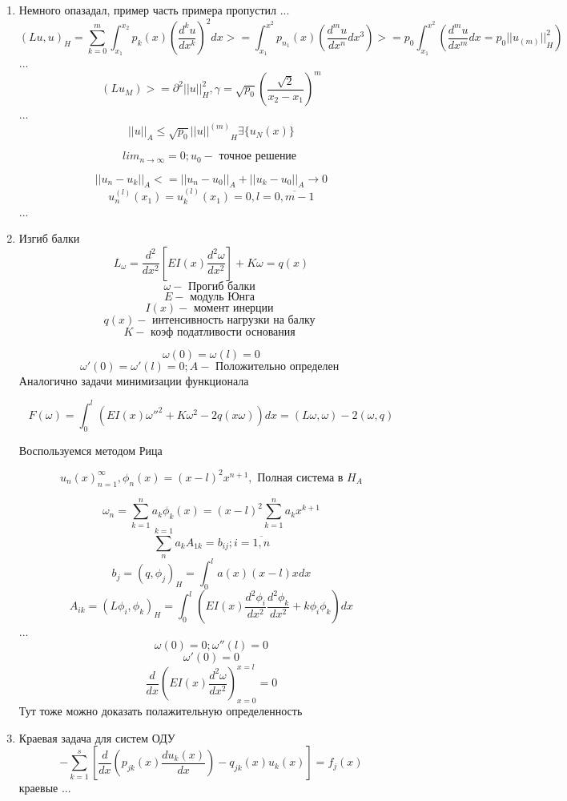 \documentclass[12pt, a4paper]{article}
\begin{document}
\begin{enumerate}
	\item Немного опазадал, пример часть примера пропустил
	...
	\[ {(Lu, u)}_H = \sum_{k=0}^{m} \int_{x_1}^{x_2} p_k (x) (\frac{d^k u }{d x^k })^2 dx >= \int_{x_1}^{x^2} p_{n_1} (x) (\frac{d^m u }{d x^n } dx^3) >= p_0 \int_{x_1}^{x^2} (\frac{d^m u }{dx^m } dx = p_0 {||u_(m)||}^2_H) \]
	...
	\[ (L u_M ) >= \partial^2 {||u||}^2_H, \gamma = \sqrt{p_0} {(\frac{\sqrt{2}}{x_2-x_1})}^m \]
	...
	\[ {||u||}_A \leq \sqrt{p_0 } {||u||^{(m)}}_H \exists \{ u_N (x) \}\]

	\[ {lim}_{n \rightarrow \infty} = 0; u_0 - \textrm{ точное решение  } \]

	\[ {||u_n - u_k ||}_A <= {||u_n - u_0||}_A + {|| u_k - u_0||}_A \rightarrow 0 \]
	\[ u^{(l)}_n (x_1) = u_k^(l) (x_1) = 0, l = \overline{0, m-1} \]
	...

	\item Изгиб балки
	\[ L_{\omega} = \frac{d^2}{dx^2} [E I(x) \frac{d^2 \omega }{dx^2}] + K\omega = q(x)\]
	\[ \omega - \textrm{ Прогиб балки } \]
	\[ E - \textrm{ модуль Юнга } \]
	\[ I(x) - \textrm{ момент инерции } \]
	\[ q(x) - \textrm{ интенсивность нагрузки на балку } \]
	\[ K - \textrm{ коэф податливости основания } \]

	\[ \omega (0) = \omega (l) = 0 \]
	\[ \omega'(0) = \omega'(l) = 0 ; A - \textrm{ Положительно определен } \]
	Аналогично задачи минимизации функционала

	\[ F(\omega) = \int_{0}^{l} (E I(x) {\omega''}^2 + K\omega^2 - 2q(x \omega)) dx = (L\omega , \omega) -2 (\omega, q)\]

	Воспользуемся методом Рица

	\[ {u_n (x)}^{\infty}_{n=1}, \phi_n (x) = {(x-l)}^2 x^{n+1}, \textrm{ Полная система в  } H_A \]

	\[ \omega_n = \sum_{k=1}^{n} a_k \phi_k (x) = {(x-l)}^2 \sum_{k=1}^{n} a_k x^{k+1} \]
	\[ \sum_{n}^{k=1} a_k A_{1k} = b_{ij}; i=\overline{1, n} \]
	\[ b_j = (q, \phi_j)_H = \int_{0}^{l } a(x) (x-l) x dx \]
	\[ A_{ik} = (L \phi_i, \phi_k)_H = \int_{0}^{l} (E I(x) \frac{d^2 \phi_i}{d x^2} \frac{d^2 \phi_k}{d x^2} + k\phi_i \phi_k) dx \]
	...
	\[ \omega(0) = 0; \omega''(l) = 0 \]
	\[ \omega' (0) = 0 \]
	\[ \frac{d }{d x } (E I(x) \frac{d^2 \omega }{d x^2})^{x=l}_{x=0} = 0 \]
	Тут тоже можно доказать полажительную определенность

	\item Краевая задача для систем ОДУ
	\[ - \sum_{k=1}^{s} [ \frac{d }{dx }(p_{jk}(x) \frac{du_k (x)}{dx}) - q_{jk}(x) u_k (x)] = f_j(x) \]
	краевые ...


\end{enumerate}
\end{document}
